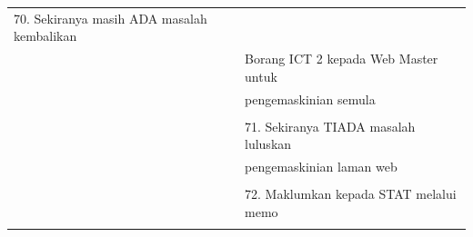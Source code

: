 \documentclass[
]{article}
\begin{document}
\begin{longtable}[]{@{}ll@{}}
\begin{minipage}[t]{0.71\columnwidth}
70. Sekiranya masih ADA masalah kembalikan\strut
\end{minipage}\tabularnewline
\begin{minipage}[t]{0.23\columnwidth}\raggedright
\strut
\end{minipage} & \begin{minipage}[t]{0.71\columnwidth}\raggedright
Borang ICT 2 kepada Web Master untuk\strut
\end{minipage}\tabularnewline
\begin{minipage}[t]{0.23\columnwidth}\raggedright
\strut
\end{minipage} & \begin{minipage}[t]{0.71\columnwidth}\raggedright
pengemaskinian semula\strut
\end{minipage}\tabularnewline
\begin{minipage}[t]{0.23\columnwidth}\raggedright
\strut
\end{minipage} & \begin{minipage}[t]{0.71\columnwidth}\raggedright
\strut
\end{minipage}\tabularnewline
\begin{minipage}[t]{0.23\columnwidth}\raggedright
\strut
\end{minipage} & \begin{minipage}[t]{0.71\columnwidth}\raggedright
71. Sekiranya TIADA masalah luluskan\strut
\end{minipage}\tabularnewline
\begin{minipage}[t]{0.23\columnwidth}\raggedright
\strut
\end{minipage} & \begin{minipage}[t]{0.71\columnwidth}\raggedright
pengemaskinian laman web\strut
\end{minipage}\tabularnewline
\begin{minipage}[t]{0.23\columnwidth}\raggedright
\strut
\end{minipage} & \begin{minipage}[t]{0.71\columnwidth}\raggedright
\strut
\end{minipage}\tabularnewline
\begin{minipage}[t]{0.23\columnwidth}\raggedright
\strut
\end{minipage} & \begin{minipage}[t]{0.71\columnwidth}\raggedright
72. Maklumkan kepada STAT melalui memo\strut
\end{minipage}\tabularnewline
\begin{minipage}[t]{0.23\columnwidth}\raggedright

\end{minipage}
\end{longtable}
\end{document}
